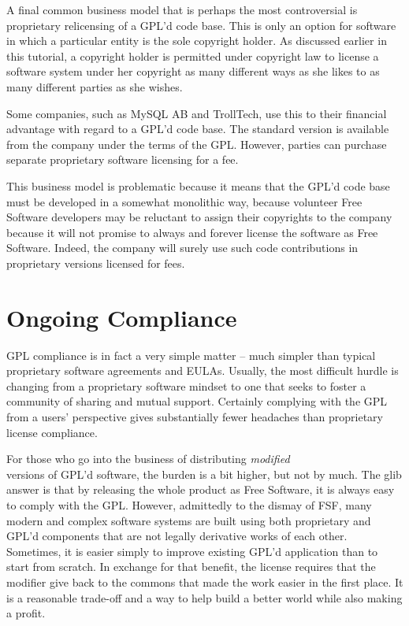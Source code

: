 \medskip

\label{Proprietary Relicensing}

A final common business model that is perhaps the most controversial is
proprietary relicensing of a GPL'd code base. This is only an option for
software in which a particular entity is the sole copyright holder. As
discussed earlier in this tutorial, a copyright holder is permitted under
copyright law to license a software system under her copyright as many
different ways as she likes to as many different parties as she wishes.

Some companies, such as MySQL AB and TrollTech, use this to their
financial advantage with regard to a GPL'd code base. The standard
version is available from the company under the terms of the GPL\@.
However, parties can purchase separate proprietary software licensing for
a fee.

This business model is problematic because it means that the GPL'd code
base must be developed in a somewhat monolithic way, because volunteer
Free Software developers may be reluctant to assign their copyrights to
the company because it will not promise to always and forever license the
software as Free Software. Indeed, the company will surely use such code
contributions in proprietary versions licensed for fees.

\section{Ongoing Compliance}

GPL compliance is in fact a very simple matter -- much simpler than
typical proprietary software agreements and EULAs. Usually, the most
difficult hurdle is changing from a proprietary software mindset to one
that seeks to foster a community of sharing and mutual support. Certainly
complying with the GPL from a users' perspective gives substantially fewer
headaches than proprietary license compliance.

For those who go into the business of distributing {\em modified\\}
versions of GPL'd software, the burden is a bit higher, but not by
much. The glib answer is that by releasing the whole product as Free
Software, it is always easy to comply with the GPL. However,
admittedly to the dismay of FSF, many modern and complex software
systems are built using both proprietary and GPL'd components that are
not legally derivative works of each other. Sometimes, it is easier simply to
improve existing GPL'd application than to start from scratch. In
exchange for that benefit, the license requires that the modifier give
back to the commons that made the work easier in the first place. It is a
reasonable trade-off and a way to help build a better world while also
making a profit.

